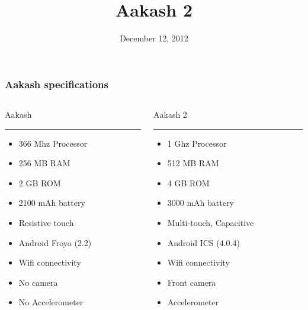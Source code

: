 \documentclass{beamer}
\title[Aakash - tablet for every Indian]{Aakash 2}
\author{}
\institute[MHRD]
{NME-ICT(MHRD), \\
Aakash Project\\
\medskip
}
\date{December 12, 2012}
\begin{document}

\begin{frame}
\titlepage
\end{frame}
\begin{frame}
\frametitle{Aakash specifications}
\begin{columns}
\begin{column}{.48\textwidth}
Aakash
\color{red}\rule{\linewidth}{2pt}
\begin{itemize}
  \item 366 Mhz Processor
  \item 256 MB RAM
  \item 2 GB ROM
  \item 2100 mAh battery
  \item Resistive touch 
  \item Android Froyo (2.2) 
  \item Wifi connectivity
  \item No camera
  \item No Accelerometer
\end{itemize}
\end{column}%
\hfill%
\begin{column}{.48\textwidth}
Aakash 2
\color{blue}\rule{\linewidth}{2pt}
\begin{itemize}
  \item 1 Ghz Processor
  \item 512 MB RAM
  \item 4 GB ROM
  \item 3000 mAh battery
  \item Multi-touch, Capacitive
  \item Android ICS (4.0.4) 
  \item Wifi connectivity
  \item Front camera
  \item Accelerometer
\end{itemize}
\end{column}%
\end{columns}
\end{frame}
\end{document}
